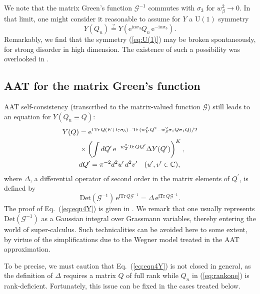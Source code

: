 \documentclass[aps,prl,twocolumn,letterpaper,superscriptaddress]{revtex4-2}
\begin{document}
We note that the matrix Green's function $\mathcal{G}^{-1}$ commutes with $\sigma_3$ for $w_\beta^2 \to 0$. In that limit, one might consider it reasonable to assume for $Y$ a $\mathrm{U}(1)$ symmetry
\begin{equation}\label{eq:U(1)}
    Y(Q_n) \stackrel{?}{=} Y(\mathrm{e}^{\mathrm{i}\alpha \sigma_3} Q_n \, \mathrm{e}^{-\mathrm{i}\alpha \sigma_3}) .
\end{equation}
Remarkably, we find that the symmetry (\ref{eq:U(1)}) may be broken spontaneously, for strong disorder in high dimension. The existence of such a possibility was overlooked in \cite{MF1992}.

\subsection{AAT for the matrix Green's function}
AAT self-consistency (transcribed to the matrix-valued function $\mathcal{G}$) still leads to an equation for $Y(Q_n \equiv Q)$:
\begin{align}\label{eq:eqn4Y}
    Y(Q) &= \mathrm{e}^{\mathrm{i}\, \mathrm{Tr}\, Q (E + \mathrm{i}\varepsilon \sigma_3) - \mathrm{Tr} \, (w_V^2 Q^2 - w_\beta^2 \sigma_1 Q \sigma_1 Q)/2} \cr &\times \left( \int dQ^\prime \, \mathrm{e}^{- w_T^2 \mathrm{Tr}\, Q Q^\prime} \Delta Y(Q^\prime) \right)^{K} , \\
    &dQ^\prime = \pi^{-2} d^2u^\prime \, d^2v^\prime \quad (u^\prime, v^\prime \in \mathbb{C}) , \nonumber
\end{align}
where $\Delta$, a differential operator of second order in the matrix elements of $Q^\prime$, is defined by
\begin{equation}
    \mathrm{Det} (\mathcal{G}^{-1}) \, \mathrm{e}^{\mathrm{i} \mathrm{Tr}\, Q \mathcal{G}^{-1}} =
    \Delta\, \mathrm{e}^{\mathrm{i} \mathrm{Tr}\, Q \mathcal{G}^{-1}} .
\end{equation}
The proof of Eq.\ (\ref{eq:eqn4Y}) is given in \cite{AZ23}. We remark that one usually represents  $\mathrm{Det} (\mathcal{G}^{-1})$ as a Gaussian integral over Grassmann variables, thereby entering the world of super-calculus. Such technicalities can be avoided here to some extent, by virtue of the simplifications due to the Wegner model treated in the AAT approximation.

To be precise, we must caution that Eq.\ (\ref{eq:eqn4Y}) is not closed in general, as the definition of $\Delta$ requires a matrix $Q$ of full rank while $Q_n$ in (\ref{eq:rankone}) is rank-deficient. Fortunately, this issue can be fixed in the cases treated below.
\end{document}
